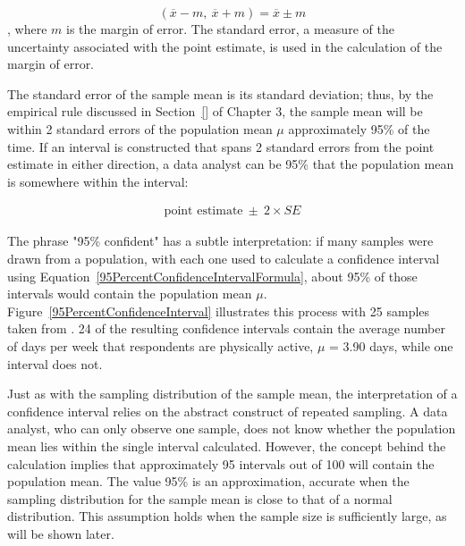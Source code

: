\begin{spacing}{1.5}
\[(\overline{x} -m, \ \overline{x} + m) = \overline{x} \pm m \],
where $m$ is the margin of error. The standard error, a measure of the uncertainty associated with the point estimate, is used in the calculation of the margin of error.


The standard error of the sample mean is its standard deviation; thus, by the empirical rule discussed in Section~\ref{} of Chapter 3, the sample mean will be within 2 standard errors of the population mean $\mu$ approximately 95\% of the time. If an interval is constructed that spans 2 standard errors from the point estimate in either direction, a data analyst can be 95\%  that the population mean is somewhere within the interval:

\begin{align}
\text{point estimate}\ \pm\ 2\times SE
\label{95PercentConfidenceIntervalFormula}
\end{align}

The phrase "95\% confident" has a subtle interpretation: if many samples were drawn from a population, with each one used to calculate a confidence interval using Equation~\ref{95PercentConfidenceIntervalFormula}, about 95\% of those intervals would contain the population mean $\mu$. Figure~\ref{95PercentConfidenceInterval} illustrates this process with 25 samples taken from . 24 of the resulting confidence intervals contain the average number of days per week that respondents are physically active, $\mu$ = 3.90 days, while one interval does not. 

Just as with the sampling distribution of the sample mean, the interpretation of a confidence interval relies on the abstract construct of repeated sampling. A data analyst, who can only observe one sample, does not know whether the population mean lies within the single interval calculated. However, the concept behind the calculation implies that approximately 95 intervals out of 100 will contain the population mean. The value 95\% is an approximation, accurate when the sampling distribution for the sample mean is close to that of a normal distribution. This assumption holds when the sample size is sufficiently large, as will be shown later.


\end{spacing}
